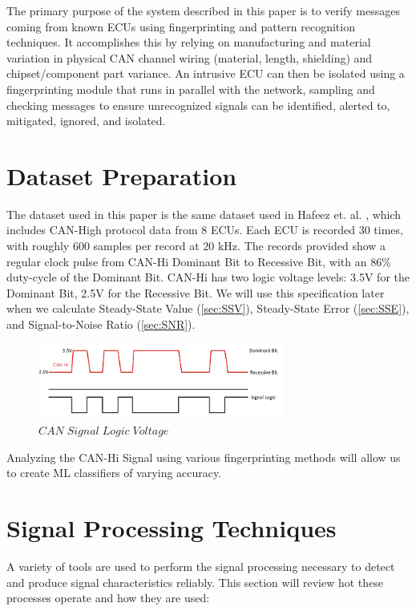\documentclass[conference]{IEEEtran}
\begin{document}
The primary purpose of the system described in this paper is to verify messages coming from known ECUs using fingerprinting and pattern recognition techniques. It accomplishes this by relying on manufacturing and material variation in physical CAN channel wiring (material, length, shielding) and chipset/component part variance. An intrusive ECU can then be isolated using a fingerprinting module that runs in parallel with the network, sampling and checking messages to ensure unrecognized signals can be identified, alerted to, mitigated, ignored, and isolated.



\section{Dataset Preparation}

The dataset used in this paper is the same dataset used in Hafeez et. al. \cite{hafeez2019}, which includes CAN-High protocol data from 8 ECUs. Each ECU is recorded 30 times, with roughly 600 samples per record at 20 kHz. The records provided show a regular clock pulse from CAN-Hi Dominant Bit to Recessive Bit, with an 86\% duty-cycle of the Dominant Bit. CAN-Hi has two logic voltage levels: 3.5V for the Dominant Bit, 2.5V for the Recessive Bit. We will use this specification later when we calculate Steady-State Value (\ref{sec:SSV}), Steady-State Error (\ref{sec:SSE}), and Signal-to-Noise Ratio (\ref{sec:SNR}).

\begin{figure}[htb]
\centering
\includegraphics[width=3.2in]{figures/02_can_hi.png}
\caption{$CAN  \; Signal \; Logic  \; Voltage$}
\label{fig:CANBitLogic}
\end{figure}

Analyzing the CAN-Hi Signal using various fingerprinting methods will allow us to create ML classifiers of varying accuracy.



\section{Signal Processing Techniques}

A variety of tools are used to perform the signal processing necessary to detect and produce signal characteristics reliably. This section will review hot these processes operate and how they are used:
\end{document}
